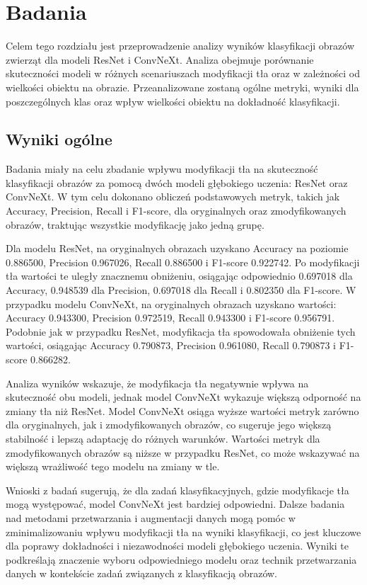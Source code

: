 \chapter*{Badania}

Celem tego rozdziału jest przeprowadzenie analizy wyników klasyfikacji obrazów zwierząt dla modeli ResNet i 
ConvNeXt. Analiza obejmuje porównanie skuteczności modeli w różnych scenariuszach modyfikacji tła oraz w zależności 
od wielkości obiektu na obrazie. Przeanalizowane zostaną ogólne metryki, wyniki dla poszczególnych klas oraz wpływ 
wielkości obiektu na dokładność klasyfikacji.

\section*{Wyniki ogólne}

Badania miały na celu zbadanie wpływu modyfikacji tła na skuteczność klasyfikacji obrazów za pomocą dwóch modeli głębokiego uczenia: ResNet 
oraz ConvNeXt. W tym celu dokonano obliczeń podstawowych metryk, takich jak Accuracy, Precision, Recall i F1-score, dla oryginalnych oraz 
zmodyfikowanych obrazów, traktując wszystkie modyfikację jako jedną grupę.

Dla modelu ResNet, na oryginalnych obrazach uzyskano Accuracy na poziomie 0.886500, Precision 0.967026, Recall 0.886500 i F1-score 0.922742. 
Po modyfikacji tła wartości te uległy znacznemu obniżeniu, osiągając odpowiednio 0.697018 dla Accuracy, 0.948539 dla Precision, 0.697018 dla 
Recall i 0.802350 dla F1-score. W przypadku modelu ConvNeXt, na oryginalnych obrazach uzyskano wartości: Accuracy 0.943300, Precision 0.972519, 
Recall 0.943300 i F1-score 0.956791. Podobnie jak w przypadku ResNet, modyfikacja tła spowodowała obniżenie tych wartości, osiągając 
Accuracy 0.790873, Precision 0.961080, Recall 0.790873 i F1-score 0.866282.

Analiza wyników wskazuje, że modyfikacja tła negatywnie wpływa na skuteczność obu modeli, jednak model ConvNeXt wykazuje większą odporność na 
zmiany tła niż ResNet. Model ConvNeXt osiąga wyższe wartości metryk zarówno dla oryginalnych, jak i zmodyfikowanych obrazów, co sugeruje jego 
większą stabilność i lepszą adaptację do różnych warunków. Wartości metryk dla zmodyfikowanych obrazów są niższe w przypadku ResNet, co może 
wskazywać na większą wrażliwość tego modelu na zmiany w tle.

Wnioski z badań sugerują, że dla zadań klasyfikacyjnych, gdzie modyfikacje tła mogą występować, model ConvNeXt jest bardziej odpowiedni. 
Dalsze badania nad metodami przetwarzania i augmentacji danych mogą pomóc w zminimalizowaniu wpływu modyfikacji tła na wyniki klasyfikacji, 
co jest kluczowe dla poprawy dokładności i niezawodności modeli głębokiego uczenia. Wyniki te podkreślają znaczenie wyboru odpowiedniego 
modelu oraz technik przetwarzania danych w kontekście zadań związanych z klasyfikacją obrazów.


